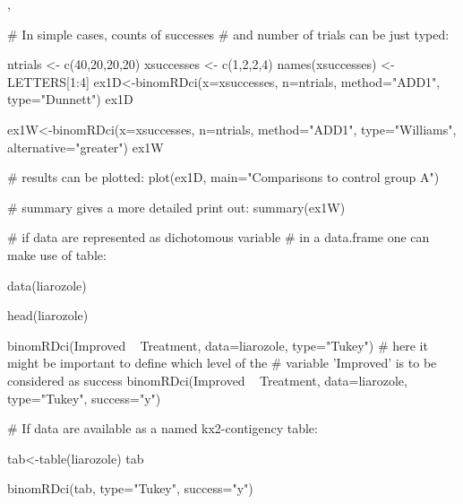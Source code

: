 \begin{SeeAlso}\relax
{}, 
\end{SeeAlso}
\begin{Examples}
\begin{ExampleCode}

# In simple cases, counts of successes
# and number of trials can be just typed:

ntrials <- c(40,20,20,20)
xsuccesses <- c(1,2,2,4)
names(xsuccesses) <- LETTERS[1:4]
ex1D<-binomRDci(x=xsuccesses, n=ntrials, method="ADD1",
 type="Dunnett")
ex1D

ex1W<-binomRDci(x=xsuccesses, n=ntrials, method="ADD1",
 type="Williams", alternative="greater")
ex1W

# results can be plotted:
plot(ex1D, main="Comparisons to control group A")

# summary gives a more detailed print out:
summary(ex1W)

# if data are represented as dichotomous variable
# in a data.frame one can make use of table:

data(liarozole)

head(liarozole)

binomRDci(Improved ~ Treatment, data=liarozole, type="Tukey")
# here it might be important to define which level of the
# variable 'Improved' is to be considered as success
binomRDci(Improved ~ Treatment, data=liarozole, type="Tukey", success="y")

# If data are available as a named kx2-contigency table:

tab<-table(liarozole)
tab

binomRDci(tab, type="Tukey", success="y")

\end{ExampleCode}
\end{Examples}

